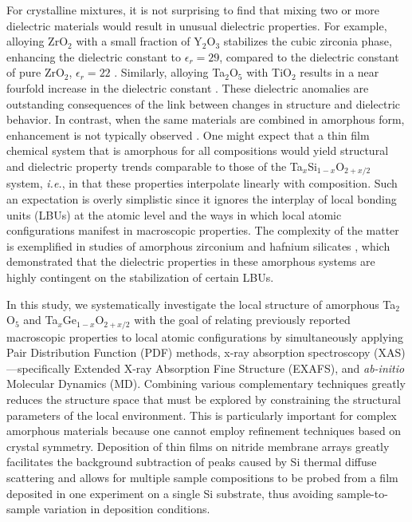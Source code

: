 For crystalline mixtures, it is not surprising to find that mixing two or more dielectric materials would result in unusual dielectric properties. For example, alloying ZrO$_{2}$ with a small fraction of Y$_{2}$O$_{3}$ stabilizes the cubic zirconia phase, enhancing the dielectric constant to $\epsilon_r = 29$, compared to the dielectric constant of pure ZrO$_{2}$, $\epsilon_r = 22$ \cite{Subramanian1989}. Similarly, alloying Ta$_{2}$O$_{5}$ with TiO$_{2}$ results in a near fourfold increase in the dielectric constant \cite{Cava1995}. These dielectric anomalies are outstanding consequences of the link between changes in structure and dielectric behavior. In contrast, when the same materials are combined in amorphous form, enhancement is not typically observed \cite{Jeong2005, Gan1998, Fujikawa1994}. One might expect that a thin film chemical system that is amorphous for all compositions would yield structural and dielectric property trends comparable to those of the Ta$_{x}$Si$_{1-x}$O$_{2+x/2}$ system, \emph{i.e.}, in that these properties interpolate linearly with composition. Such an expectation is overly simplistic since it ignores the interplay of local bonding units (LBUs) at the atomic level and the ways in which local atomic configurations manifest in macroscopic properties. The complexity of the matter is exemplified in studies of amorphous zirconium and hafnium silicates \cite{Rignanese2002, Pignedoli2007}, which demonstrated that the dielectric properties in these amorphous systems are highly contingent on the stabilization of certain LBUs.

In this study, we systematically investigate the local structure of amorphous Ta$_{2}$O$_{5}$ and Ta$_{x}$Ge$_{1-x}$O$_{2+x/2}$ with the goal of relating previously reported macroscopic properties to local atomic configurations by simultaneously applying Pair Distribution Function (PDF) methods, x-ray absorption spectroscopy (XAS)---specifically Extended X-ray Absorption Fine Structure (EXAFS), and \emph{ab-initio} Molecular Dynamics (MD). Combining various complementary techniques greatly reduces the structure space that must be explored by constraining the structural parameters of the local environment. This is particularly important for complex amorphous materials because one cannot employ refinement techniques based on crystal symmetry. Deposition of thin films on nitride membrane arrays greatly facilitates the background subtraction of peaks caused by Si thermal diffuse scattering \cite{Gregoire2009a} and allows for multiple sample compositions to be probed from a film deposited in one experiment on a single Si substrate, thus avoiding sample-to-sample variation in deposition conditions.

